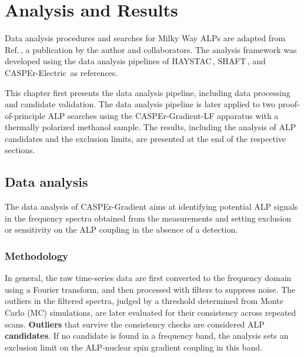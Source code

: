 \chapter{Analysis and Results}\label{chap:results}
\begin{jointwork}
    Data analysis procedures and searches for Milky Way ALPs are adapted from Ref.\,\cite{Walter2025_CASPErLFthermal}, a publication by the author and collaborators.
    The analysis framework was developed using the data analysis pipelines of HAYSTAC\,\cite{Brubaker2017_HAYSTAC}, SHAFT\,\cite{Gramolin2021_Ferromagnetic}, and CASPEr-Electric\,\cite{aybas2021_SolidStateNMR} as references.
\end{jointwork}

This chapter first presents the data analysis pipeline, including data processing and candidate validation.
The data analysis pipeline is later applied to two proof-of-principle ALP searches using the CASPEr-Gradient-LF apparatus with a thermally polarized methanol sample.
The results, including the analysis of ALP candidates and the exclusion limits, are presented at the end of the respective sections.


\section{Data analysis}\label{sec:results:data_analysis}

The data analysis of CASPEr-Gradient aims at identifying potential ALP signals in the frequency spectra obtained from the measurements and setting exclusion or sensitivity on the ALP coupling in the absence of a detection.


\subsection{Methodology}\label{sec:results:data_analysis:methodology}

In general, the raw time-series data are first converted to the frequency domain using a Fourier transform, and then processed with filters to suppress noise.
The outliers in the filtered spectra, judged by a threshold determined from Monte Carlo (MC) simulations, are later evaluated for their consistency across repeated scans.
\textbf{Outliers} that survive the consistency checks are considered ALP \textbf{candidates}.
If no candidate is found in a frequency band, the analysis sets an exclusion limit on the ALP-nuclear spin gradient coupling in this band.

